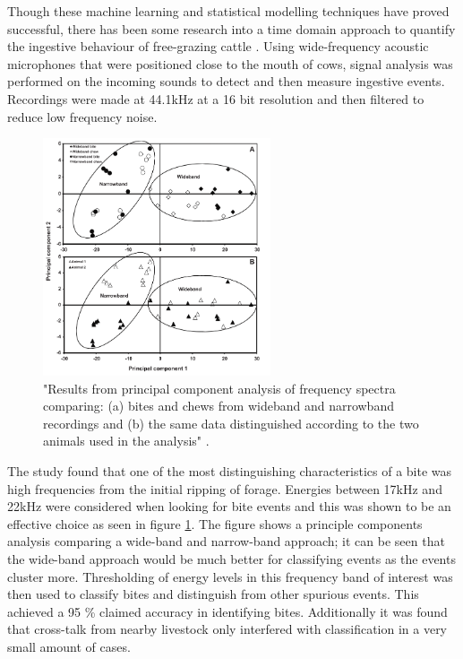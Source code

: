 Though these machine learning and statistical modelling techniques have proved successful, there has been some research into a time domain approach to quantify the ingestive behaviour of free-grazing cattle \cite{Clapham2011}. Using wide-frequency acoustic microphones that were positioned close to the mouth of cows, signal analysis was performed on the incoming sounds to detect and then measure ingestive events. Recordings were made at 44.1kHz at a 16 bit resolution and then filtered to reduce low frequency noise. 

\begin{figure}[H]
\begin{center}
\leavevmode
\includegraphics[width=0.6\textwidth]{images/clapham.png}
\end{center}
\caption[PCA of bite/chew frequency spectra]{"Results from principal component analysis of frequency spectra comparing: (a) bites and chews from wideband and narrowband recordings and (b) the same data distinguished according to the two animals used in the analysis" \cite{Clapham2011}. }
\label{clapham}
\end{figure}

The study found that one of the most distinguishing characteristics of a bite was high frequencies from the initial ripping of forage. Energies between 17kHz and 22kHz were considered when looking for bite events and this was shown to be an effective choice as seen in figure \ref{clapham}. The figure shows a principle components analysis comparing a wide-band and narrow-band approach; it can be seen that the wide-band approach would be much better for classifying events as the events cluster more. Thresholding of energy levels in this frequency band of interest was then used to classify bites and distinguish from other spurious events. This achieved a 95 \% claimed accuracy in identifying bites. Additionally it was found that cross-talk from nearby livestock only interfered with classification in a very small amount of cases. 

